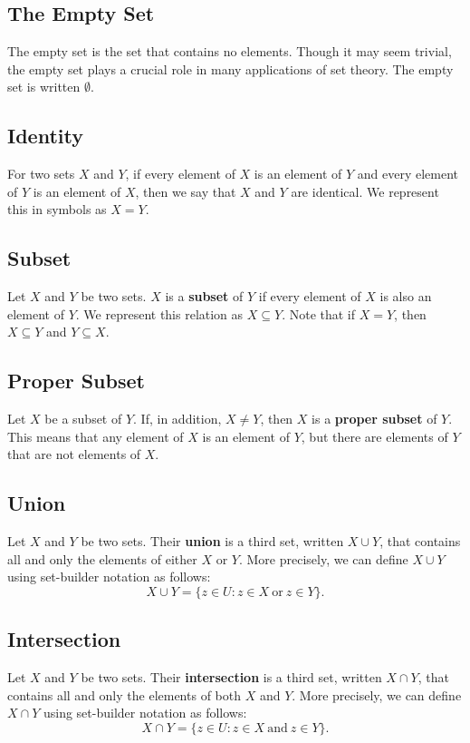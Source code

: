 \documentclass[11pt]{article}
\theoremstyle{definition}
\theoremstyle{remark}
\begin{document}
\subsection{The Empty Set}
The empty set is the set that contains no elements. Though it may seem trivial, the empty set plays a crucial role in many applications of set theory. The empty set is written $\emptyset$.

\subsection{Identity}
For two sets $X$ and $Y$, if every element of $X$ is an element of $Y$ and every element of $Y$ is an element of $X$, then we say that $X$ and $Y$ are identical. We represent this in symbols as $X=Y$.

\subsection{Subset}
Let $X$ and $Y$ be two sets. $X$ is a \textbf{subset} of $Y$ if every element of $X$ is also an element of $Y$. We represent this relation as $X\subseteq Y$. Note that if $X=Y$, then $X\subseteq Y$ and $Y\subseteq X$. 

\subsection{Proper Subset}
Let $X$ be a subset of $Y$. If, in addition, $X\neq Y$, then $X$ is a \textbf{proper subset} of $Y$. This means that any element of $X$ is an element of $Y$, but there are elements of $Y$ that are not elements of $X$. 

\subsection{Union}
Let $X$ and $Y$ be two sets. Their \textbf{union} is a third set, written $X\cup Y$, that contains all and only the elements of either $X$ or $Y$. More precisely, we can define $X\cup Y$ using set-builder notation as follows:
$$X\cup Y = \{z\in U: z\in X \ \text{or} \ z\in Y\}.$$

\subsection{Intersection}
Let $X$ and $Y$ be two sets. Their \textbf{intersection} is a third set, written $X\cap Y$, that contains all and only the elements of both $X$ and $Y$. More precisely, we can define $X\cap Y$ using set-builder notation as follows:
$$X\cap Y = \{z\in U: z\in X \ \text{and} \ z\in Y\}.$$
\end{document}
